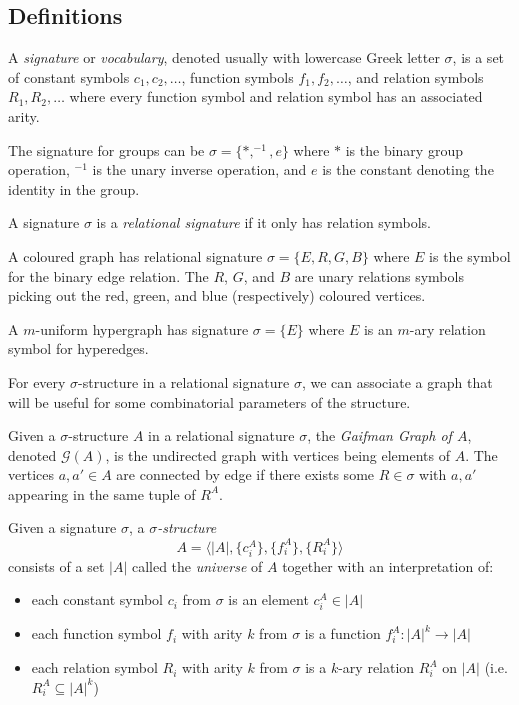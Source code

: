 \subsection{Definitions}
\begin{defn}
A \textit{signature} or \textit{vocabulary}, denoted usually with lowercase Greek letter $\sigma$, is a set of constant symbols $c_{1},c_{2},\dots$, function symbols $f_{1},f_{2},\dots$, and relation symbols $R_{1},R_{2},\dots$ where every function symbol and relation symbol has an associated arity. 
\end{defn}
\begin{exmpl}
The signature for groups can be $\sigma = \{*,^{-1},e\}$ where $*$ is the binary group operation, $^{-1}$ is the unary inverse operation, and $e$ is the constant denoting the identity in the group. 
\end{exmpl}
\begin{defn}
A signature $\sigma$ is a \textit{relational signature} if it only has relation symbols.
\end{defn}
\begin{exmpl}
A coloured graph has relational signature $\sigma = \{E,R,G,B\}$ where $E$ is the symbol for the binary edge relation. The $R$, $G$, and $B$ are unary relations symbols picking out the red, green, and blue (respectively) coloured vertices. 
\end{exmpl}
\begin{exmpl}
A $m$-uniform hypergraph has signature $\sigma = \{E\}$ where $E$ is an $m$-ary relation symbol for hyperedges.
\end{exmpl}
For every $\sigma$-structure in a relational signature $\sigma$, we can associate a graph that will be useful for some combinatorial parameters of the structure.
\begin{defn}
Given a $\sigma$-structure $A$ in a relational signature $\sigma$, the \textit{Gaifman Graph of $A$}, denoted $\mathcal{G}(A)$, is the undirected graph with vertices being elements of $A$. The vertices $a,a' \in A$ are connected by edge if there exists some $R \in \sigma$ with $a,a'$ appearing in the same tuple of $R^{A}$. 
\label{defn:gaifmanGraph}
\end{defn}
\begin{defn}
Given a signature $\sigma$, a \textit{$\sigma$-structure} 
$$A = \langle |A|, \{c_{i}^{A}\}, \{f_{i}^{A}\}, \{R_{i}^{A}\} \rangle$$ 
consists of a set $|A|$ called the \textit{universe} of $A$ together with an interpretation of:
\begin{itemize}
    \item each constant symbol $c_{i}$ from $\sigma$ is an element $c_{i}^{A} \in |A|$ 
    \item each function symbol $f_{i}$ with arity $k$ from $\sigma$ is a function $f_{i}^{A}:|A|^{k} \longrightarrow |A|$
    \item each relation symbol $R_{i}$ with arity $k$ from $\sigma$ is a $k$-ary relation $R_{i}^{A}$ on $|A|$ (i.e. $R_{i}^{A} \subseteq |A|^{k}$) 
\end{itemize}
\label{defn:structure}
\end{defn}
